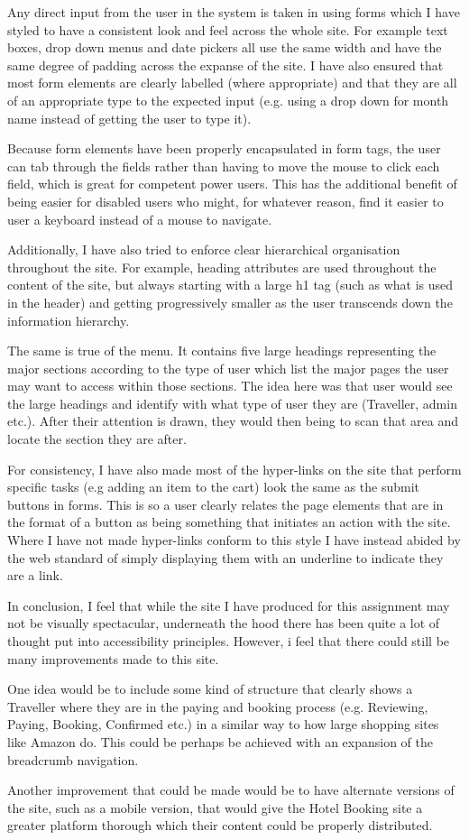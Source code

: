 \documentclass{article}
\begin{document}
Any direct input from the user in the system is taken in using forms which I have styled to have a consistent look and feel across the whole site. For example text boxes, drop down menus and date pickers all use the same width and have the same degree of padding across the expanse of the site. I have also ensured that most form elements are clearly labelled (where appropriate) and that they are all of an  appropriate type to the expected input (e.g. using a drop down for month name instead of getting the user to type it). 

Because form elements have been properly encapsulated in form tags, the user can tab through the fields rather than having to move the mouse to click each field, which is great for competent power users. This has the additional benefit of being easier for disabled users who might, for whatever reason, find it easier to user a keyboard instead of a mouse to navigate.

Additionally, I have also tried to enforce clear hierarchical organisation throughout the site. For example, heading attributes are used throughout the content of the site, but always starting with a large h1 tag (such as what is used in the header) and getting progressively smaller as the user transcends down the information hierarchy. 

The same is true of the menu. It contains five large headings representing the major sections according to the type of user which list the major pages the user may want to access within those sections. The idea here was that user would see the large headings and identify with what type of user they are (Traveller, admin etc.). After their attention is drawn, they would then being to scan that area and locate the section they are after.

For consistency, I have also made most of the hyper-links on the site that perform specific tasks (e.g adding an item to the cart) look the same as the submit buttons in forms. This is so a user clearly relates the page elements that are in the format of a button as being something that initiates an action with the site. Where I have not made hyper-links conform to this style I have instead abided by the web standard of simply displaying them with an underline to indicate they are a link.

In conclusion, I feel that while the site I have produced for this assignment may not be visually spectacular, underneath the hood there has been quite a lot of thought put into accessibility principles. However, i feel that there could still be many improvements made to this site. 

One idea would be to include some kind of structure that clearly shows a Traveller where they are in the paying and booking process (e.g. Reviewing, Paying, Booking, Confirmed etc.) in a similar way to how large shopping sites like Amazon do. This could be perhaps be achieved with an expansion of the breadcrumb navigation.

Another improvement that could be made would be to have alternate versions of the site, such as a mobile version, that would give the Hotel Booking site a greater platform thorough which their content could be properly distributed.
\end{document}
